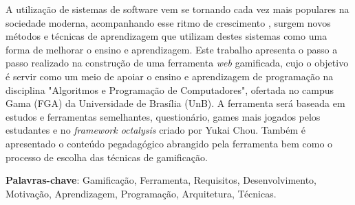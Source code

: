 \begin{resumo}

A utilização de sistemas de software vem se tornando cada vez mais populares na sociedade moderna, acompanhando esse ritmo de crescimento
, surgem novos métodos e técnicas de aprendizagem que utilizam destes sistemas como uma forma de melhorar o ensino e aprendizagem. Este trabalho 
apresenta o passo a passo realizado na construção de uma ferramenta \textit{web} gamificada, cujo o objetivo é servir como um meio
de apoiar o ensino e aprendizagem de programação na disciplina "Algoritmos e Programação de Computadores", ofertada no campus Gama (FGA) da 
Universidade de Brasília (UnB). A ferramenta será baseada em estudos e ferramentas semelhantes, questionário, games mais jogados 
pelos estudantes e no \textit{framework octalysis} criado por Yukai Chou. Também é apresentado o conteúdo pegadagógico abrangido pela ferramenta
bem como o processo de escolha das técnicas de gamificação.

 \vspace{\onelineskip}
    
 \noindent
 \textbf{Palavras-chave}: Gamificação, Ferramenta, Requisitos, Desenvolvimento, Motivação, Aprendizagem, Programação, Arquitetura, Técnicas.
\end{resumo}
